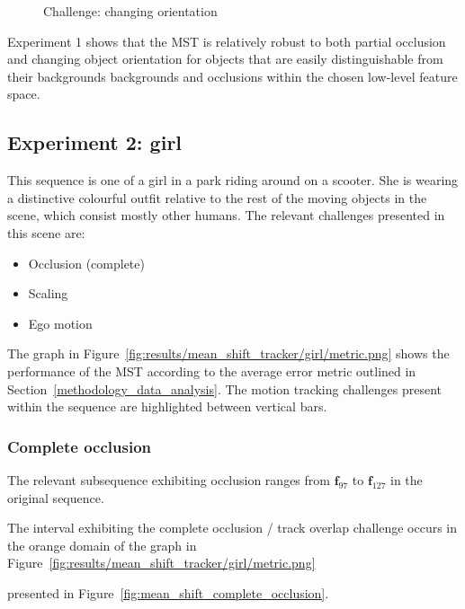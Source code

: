\begin{figure}
{\begin{tabular}{cccc}
        \end{tabular}}
    \caption{Challenge: changing orientation\label{fig:mean_shift_orientation}
 }
\end{figure}

Experiment 1 shows that the MST is relatively robust to both partial occlusion and changing
object orientation for objects that are easily distinguishable from their
backgrounds backgrounds and occlusions within the chosen low-level feature space.

\subsection{Experiment 2: girl}
This sequence is one of a girl in a park riding around on a scooter. She is
wearing a distinctive colourful outfit relative to the rest of the moving objects in the
scene, which consist mostly other humans.
The relevant challenges presented in this scene are:
\begin{itemize}
    \item Occlusion (complete)
    \item Scaling 
    \item Ego motion  
\end{itemize}

The graph in Figure~\ref{fig:results/mean_shift_tracker/girl/metric.png} shows the
performance of the MST according to the average error metric outlined in
Section~\ref{methodology_data_analysis}. 
The motion tracking challenges present within the sequence are highlighted
between vertical bars.


\subsubsection{Complete occlusion}
The relevant subsequence exhibiting occlusion ranges from $\mathbf{f}_{97}$ to
$\mathbf{f}_{127}$ in the original sequence. 

The interval exhibiting the complete occlusion / track overlap challenge occurs in
the orange domain of the graph in Figure~\ref{fig:results/mean_shift_tracker/girl/metric.png}

presented in Figure~\ref{fig:mean_shift_complete_occlusion}.

